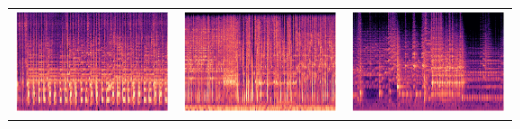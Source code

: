 \documentclass[a4paper,10pt]{article}
\begin{document}
\begin{table}[!ht]
\begin{tabular}{ccc}
        \includegraphics[scale=0.3]{disco.png} &  \includegraphics[scale=0.3]{hiphop.png} & \includegraphics[scale=0.3]{jazz.png}\\ 

\end{tabular}
\end{table}
\end{document}
